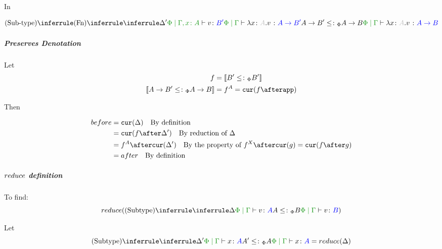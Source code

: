 {                In

                \begin{equation}
                    \ntreeruleII{Sub-type}{
                        \ntreeruleI{Fn}{
                            \treeruleI{
                                \D'
                            }{
                                \etyperelation{\P}{\gax}{v}{B'}
                            }    
                        }{
                            \gpetyperelation{\lam{x}{A}{v}}{\fntype{A}{B'}}
                        }
                        }{
                        \fntype{A}{B'}\subtypep\fntype{A}{B}
                    } {
                        \gpetyperelation{\lam{x}{A}{v}}{\fntype{A}{B}}
                    }
                \end{equation}

            \subparagraph{Preserves Denotation}
                Let
                \begin{align}
                    f &= \deno{B'\subtypep B'} \\
                    \deno{\fntype{A}{B'}\subtypep\fntype{A}{B}} & = f^A = \cur{f\after \app}
                \end{align}

                Then

                \begin{align}
                    before & = \cur{\D} \qt{By definition}\\
                            & = \cur{f\after\D'} \qt{By reduction of $\D$} \\
                            & = f^A\after\cur{\D'}\qt{By the property of $f^X\after\cur{g} = \cur{f\after g}$} \\
                            & = after \qt{By definition}\\
                \end{align}

            \subparagraph{$reduce$ definition}
            To find:
            \begin{equation}
                \reduce(\ntreeruleII{Subtype}{\treeruleI{\D}{\gpetyperelation{v}{A}}}{ A \subtypep B}{\gpetyperelation{v}{B}})
            \end{equation}

            Let 
            \begin{equation}\label{SubtypeDeltaReduction}
                \ntreeruleII{Subtype}{\treeruleI{\D'}{\gpetyperelation{x}{A}}}{ A'\subtypep A}{\gpetyperelation{x}{A}} = \reduce(\D)
            \end{equation}

}
